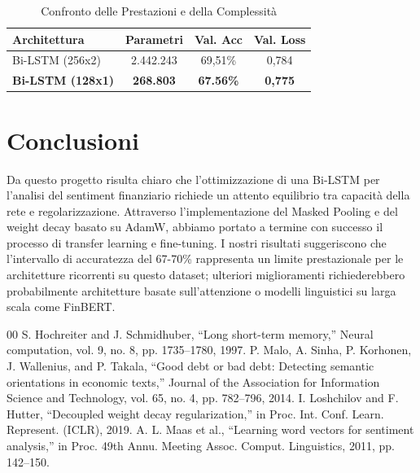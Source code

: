 \documentclass[conference]{IEEEtran}
\begin{document}
\begin{table}[htbp]
    \caption{Confronto delle Prestazioni e della Complessità}
    \begin{center}
        \begin{tabular}{|l|c|c|c|}
            \hline
            \textbf{Architettura}    & \textbf{Parametri} & \textbf{Val. Acc} & \textbf{Val. Loss} \\
            \hline
            Bi-LSTM (256x2)          & 2.442.243          & 69,51\%           & 0,784              \\
            \textbf{Bi-LSTM (128x1)} & \textbf{268.803}   & \textbf{67.56\%}  & \textbf{0,775}     \\
            \hline
        \end{tabular}
        \label{tab:results}
    \end{center}
\end{table}

\section{Conclusioni}
Da questo progetto risulta chiaro che l'ottimizzazione di una Bi-LSTM per l'analisi del sentiment finanziario richiede un attento equilibrio tra capacità della rete e regolarizzazione. Attraverso l'implementazione del Masked Pooling e del weight decay basato su AdamW, abbiamo portato a termine con successo il processo di transfer learning e fine-tuning. I nostri risultati suggeriscono che l'intervallo di accuratezza del 67-70\% rappresenta un limite prestazionale per le architetture ricorrenti su questo dataset; ulteriori miglioramenti richiederebbero probabilmente architetture basate sull'attenzione o modelli linguistici su larga scala come FinBERT.

\begin{thebibliography}{00}
     S. Hochreiter and J. Schmidhuber, ``Long short-term memory,'' Neural computation, vol. 9, no. 8, pp. 1735--1780, 1997.
     P. Malo, A. Sinha, P. Korhonen, J. Wallenius, and P. Takala, ``Good debt or bad debt: Detecting semantic orientations in economic texts,'' Journal of the Association for Information Science and Technology, vol. 65, no. 4, pp. 782--796, 2014.
     I. Loshchilov and F. Hutter, ``Decoupled weight decay regularization,'' in Proc. Int. Conf. Learn. Represent. (ICLR), 2019.
     A. L. Maas et al., ``Learning word vectors for sentiment analysis,'' in Proc. 49th Annu. Meeting Assoc. Comput. Linguistics, 2011, pp. 142--150.
\end{thebibliography}
\end{document}
